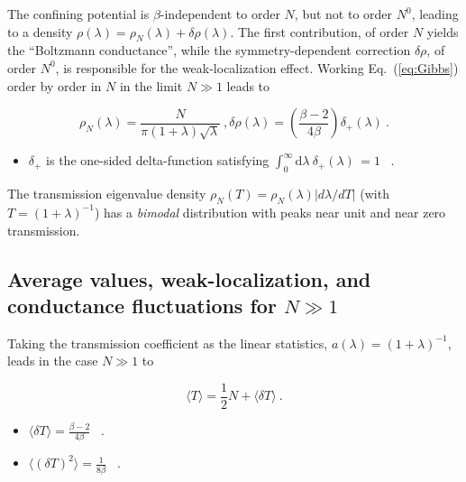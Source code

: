 \documentclass[a4paper,10pt]{article}
\newcommand{\dif}{\mathrm{d}}
\newcommand{\nin}{\noindent}
\newcommand{\be}{\begin{equation}}
\newcommand{\ee}{\end{equation}}
\newcommand{\dlT}{\delta T}
\begin{document}
\nin The confining potential is $\beta$-independent to order $N$, but not to order $N^{0}$, leading to a density   
$\rho(\lambda)=\rho_{N}(\lambda)+\delta\rho(\lambda)$. The first  contribution, of order $N$ yields the ``Boltzmann conductance'', while the symmetry-dependent correction $\delta \rho$, of order $N^0$, is responsible for the weak-localization effect. Working Eq.\ (\ref{eq:Gibbs}) order by order in $N$ in the limit $N \gg 1$ leads to 

\begin{subequations}
\label{eqs:lambda_density} 
\begin{equation}
\rho_N(\lambda) = \frac{N}{\pi (1+\lambda) \sqrt{\lambda}} \ ,
\end{equation}
\begin{equation}
\delta \rho (\lambda)=\left(\frac{\beta-2}{4\beta}\right) \delta_{+}(\lambda) \ .
\end{equation}
\end{subequations}

\begin{itemize}

\item $\delta_{+}$ is the one-sided delta-function satisfying $\int_0^{\infty} \dif \lambda \ \delta_{+}(\lambda)\,=1$ \ .
\end{itemize}

\nin The transmission eigenvalue density $\rho_{N}(T)=\rho_N(\lambda)|d\lambda/dT|$ (with $T=(1+\lambda)^{-1}$) has a
{\em bimodal\/} distribution with peaks near unit and
near zero transmission.

\subsection{Average values, weak-localization, and conductance fluctuations for $N \gg 1$}
\label{sub:avwlcf}

Taking the transmission coefficient as the linear statistics, $a(\lambda)=(1+\lambda)^{-1}$, leads in the case $N \gg 1$ to
\cite{BarMel,JPB}

\be
\label{eq:RMT}
\langle T \rangle = \frac{1}{2} N + \langle \delta T \rangle \ .
\ee

\begin{itemize}

\item $\langle \delta T \rangle = \frac{\beta-2}{4\beta}$ \ .

\item $\langle(\dlT)^2\rangle = \frac{1}{8\beta}$ \ .

\end{itemize} 
\end{document}
